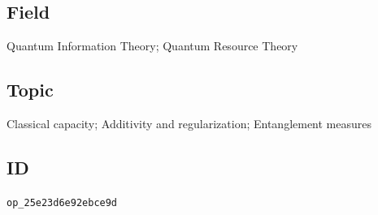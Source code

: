 \subsection*{Field}

Quantum Information Theory; Quantum Resource Theory

\subsection*{Topic}

Classical capacity; Additivity and regularization; Entanglement measures

\subsection*{ID}

\texttt{op\_25e23d6e92ebce9d}
